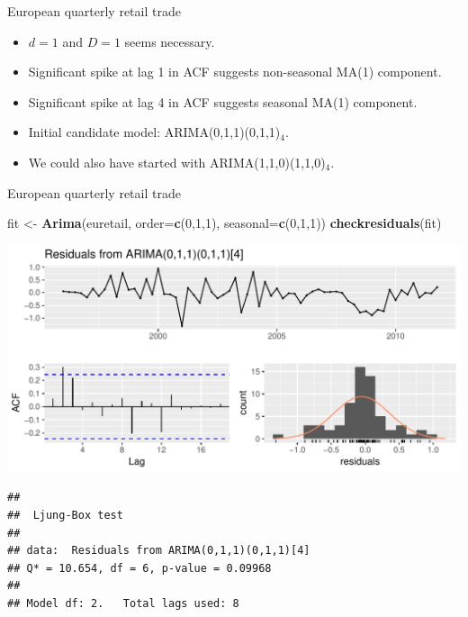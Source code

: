 \documentclass[14pt,ignorenonframetext,]{beamer}
\newenvironment{Shaded}{\begin{snugshade}}{\end{snugshade}}
\newcommand{\KeywordTok}[1]{\textcolor[rgb]{0.13,0.29,0.53}{\textbf{#1}}}
\newcommand{\DataTypeTok}[1]{\textcolor[rgb]{0.13,0.29,0.53}{#1}}
\newcommand{\DecValTok}[1]{\textcolor[rgb]{0.00,0.00,0.81}{#1}}
\newcommand{\StringTok}[1]{\textcolor[rgb]{0.31,0.60,0.02}{#1}}
\newcommand{\NormalTok}[1]{#1}
\providecommand{\tightlist}{%
  \setlength{\itemsep}{0pt}\setlength{\parskip}{0pt}}
\begin{document}
\begin{frame}{European quarterly retail trade}

\begin{itemize}
\tightlist
\item
  \(d=1\) and \(D=1\) seems necessary.
\item
  Significant spike at lag 1 in ACF suggests non-seasonal MA(1)
  component.
\item
  Significant spike at lag 4 in ACF suggests seasonal MA(1) component.
\item
  Initial candidate model: ARIMA(0,1,1)(0,1,1)\(_4\).
\item
  We could also have started with ARIMA(1,1,0)(1,1,0)\(_4\).
\end{itemize}

\end{frame}

\begin{frame}[fragile]{European quarterly retail trade}

\begin{Shaded}
\begin{Highlighting}[]
\NormalTok{fit <-}\StringTok{ }\KeywordTok{Arima}\NormalTok{(euretail, }\DataTypeTok{order=}\KeywordTok{c}\NormalTok{(}\DecValTok{0}\NormalTok{,}\DecValTok{1}\NormalTok{,}\DecValTok{1}\NormalTok{),}
  \DataTypeTok{seasonal=}\KeywordTok{c}\NormalTok{(}\DecValTok{0}\NormalTok{,}\DecValTok{1}\NormalTok{,}\DecValTok{1}\NormalTok{))}
\KeywordTok{checkresiduals}\NormalTok{(fit)}
\end{Highlighting}
\end{Shaded}

\includegraphics{week_5_arima_files/figure-beamer/unnamed-chunk-45-1.pdf}

\begin{verbatim}
## 
##  Ljung-Box test
## 
## data:  Residuals from ARIMA(0,1,1)(0,1,1)[4]
## Q* = 10.654, df = 6, p-value = 0.09968
## 
## Model df: 2.   Total lags used: 8
\end{verbatim}

\end{frame}
\end{document}
